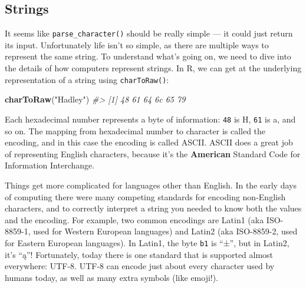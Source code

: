 \documentclass[]{book}
\newenvironment{Shaded}{\begin{snugshade}}{\end{snugshade}}
\newcommand{\KeywordTok}[1]{\textcolor[rgb]{0.13,0.29,0.53}{\textbf{{#1}}}}
\newcommand{\DataTypeTok}[1]{\textcolor[rgb]{0.13,0.29,0.53}{{#1}}}
\newcommand{\StringTok}[1]{\textcolor[rgb]{0.31,0.60,0.02}{{#1}}}
\newcommand{\CommentTok}[1]{\textcolor[rgb]{0.56,0.35,0.01}{\textit{{#1}}}}
\newcommand{\NormalTok}[1]{{#1}}
\begin{document}
\begin{Shaded}
\end{Shaded}

\subsection{Strings}\label{readr-strings}

It seems like \texttt{parse\_character()} should be really simple --- it
could just return its input. Unfortunately life isn't so simple, as
there are multiple ways to represent the same string. To understand
what's going on, we need to dive into the details of how computers
represent strings. In R, we can get at the underlying representation of
a string using \texttt{charToRaw()}:

\begin{Shaded}
\begin{Highlighting}[]
\KeywordTok{charToRaw}\NormalTok{(}\StringTok{"Hadley"}\NormalTok{)}
\CommentTok{#> [1] 48 61 64 6c 65 79}
\end{Highlighting}
\end{Shaded}

Each hexadecimal number represents a byte of information: \texttt{48} is
H, \texttt{61} is a, and so on. The mapping from hexadecimal number to
character is called the encoding, and in this case the encoding is
called ASCII. ASCII does a great job of representing English characters,
because it's the \textbf{American} Standard Code for Information
Interchange.

Things get more complicated for languages other than English. In the
early days of computing there were many competing standards for encoding
non-English characters, and to correctly interpret a string you needed
to know both the values and the encoding. For example, two common
encodings are Latin1 (aka ISO-8859-1, used for Western European
languages) and Latin2 (aka ISO-8859-2, used for Eastern European
languages). In Latin1, the byte \texttt{b1} is ``±'', but in Latin2,
it's ``ą''! Fortunately, today there is one standard that is supported
almost everywhere: UTF-8. UTF-8 can encode just about every character
used by humans today, as well as many extra symbols (like emoji!).
\end{document}
